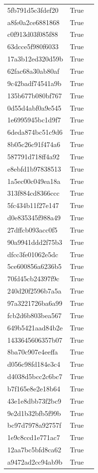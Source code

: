 \begin{tabular}{lrl}
5fb791d5c3fdef20 & True &  \\
a8fe0a2ce6881868 & True &  \\
c0f913d03f085f88 & True &  \\
63dcce5f980f6033 & True &  \\
17a3b12ed320d59b & True &  \\
62fac68a30ab80af & True &  \\
9c42badf74541a9b & True &  \\
135b677b080bf767 & True &  \\
0d55d4abf0a9e545 & True &  \\
1e6995945bc1d9f7 & True &  \\
6deda874bc51c9d6 & True &  \\
8b05c26c91f474a6 & True &  \\
587791d718ff4a92 & True &  \\
e8ebfd1b97838513 & True &  \\
1a5ec00c049ea18a & True &  \\
313f884cd8366ccc & True &  \\
5fc434b11f27e147 & True &  \\
d0e835345f988a49 & True &  \\
27dffcb093acc0f5 & True &  \\
90a9941ddd2f75b3 & True &  \\
dfcc3fe01062e5dc & True &  \\
5ce600856a6236b5 & True &  \\
70fd45cb24397f9c & True &  \\
240d20f2596b7a5a & True &  \\
97a3221726ba6a99 & True &  \\
fcb2d6b803bea567 & True &  \\
649b5421aad84b2e & True &  \\
1433645606357b07 & True &  \\
8ba70c907e4eeffa & True &  \\
d056c98fd184e3c4 & True &  \\
d4038d5bcc2c6bc7 & True &  \\
b7f165e8e2e18b64 & True &  \\
43e1e8dbb73f2bc9 & True &  \\
9e2d1b32bfb5f99b & True &  \\
bc97d7978a92757f & True &  \\
1e9c8ccd1e771ac7 & True &  \\
12aa7bc5bfd8ca62 & True &  \\
a9472ad2cc94ab9b & True &  \\

\end{tabular}
